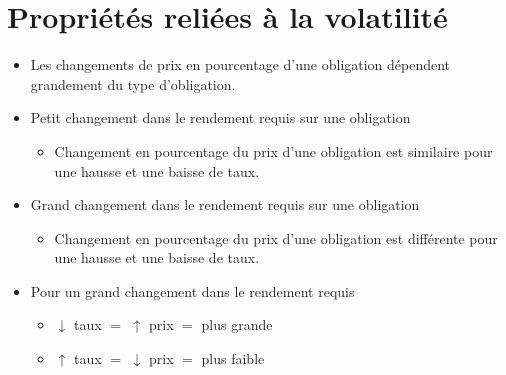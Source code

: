 \documentclass[12pt]{article}
\begin{document}
\section{Propriétés reliées à la volatilité}
\begin{itemize}
\item Les changements de prix en pourcentage d'une obligation dépendent grandement du type d'obligation. 
\item Petit changement dans le rendement requis sur une obligation 
\begin{itemize}
\item Changement en pourcentage du prix d'une obligation est similaire pour une hausse et une baisse de taux.
\end{itemize}
\item Grand changement dans le rendement requis sur une obligation 
\begin{itemize}
\item Changement en pourcentage du prix d'une obligation est différente pour une hausse et une baisse de taux.
\end{itemize}
\item Pour un grand changement dans le rendement requis 
\begin{itemize}
\item $\downarrow$ taux $=$ $\uparrow$ prix $=$ plus grande
\item $\uparrow$ taux $=$ $\downarrow$ prix $=$ plus faible
\end{itemize}
\end{itemize}
\end{document}
